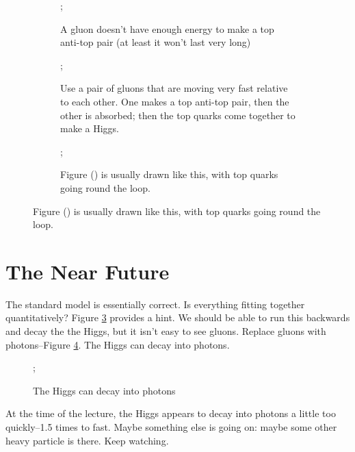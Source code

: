 \documentclass[]{article}
\begin{document}
\begin{figure}[H]
	\caption{How to make a Higgs from gluons}
	\begin{subfigure}[t]{0.3\textwidth}
		\caption{A gluon doesn't have enough energy to make a top anti-top pair (at least it won't last very long)}
		;
	\end{subfigure}
	\hfill
	\begin{subfigure}[t]{0.3\textwidth}
		\caption{Use a pair of gluons that are moving very fast relative to each other. One makes a top anti-top pair, then the other is absorbed; then the top quarks come together to make a Higgs.}\label{fig:2-a3-gluons}
		;
	\end{subfigure}
	\hfill
	\begin{subfigure}[t]{0.3\textwidth}
		\caption{Figure () is usually drawn like this, with top quarks going round the loop. }\label{fig:2-a3-higgs-neat}
		;
	\end{subfigure}
\end{figure}



\section{The Near Future}

The standard model is essentially correct. Is everything fitting together quantitatively? Figure \ref{fig:2-a3-higgs-neat} provides a hint. We should be able to run this backwards and decay the the Higgs, but it isn't easy to see gluons. Replace gluons with photons--Figure \ref{fig:Higgs:to:photons}. The Higgs can decay into photons. 

\begin{figure}[H]
	\begin{center}
		\caption{The Higgs can decay into photons}\label{fig:Higgs:to:photons}
		;
	\end{center}
\end{figure}
At the time of the lecture, the Higgs appears to decay into photons a little too quickly--1.5 times to fast. Maybe something else is going on: maybe some other heavy particle is there. Keep watching. 



\end{document}
